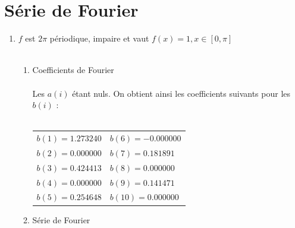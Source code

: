 \documentclass[a4paper,12pt]{report}
\begin{document}
\chapter{Série de Fourier}
	\begin{enumerate}
		\item $f$ est $2\pi$ périodique, impaire et vaut $f(x)=1, x \in [0,\pi]$ \\ \\
		\begin{enumerate}
			\item Coefficients de Fourier \\ \\
			Les $a(i)$ étant nuls. On obtient ainsi les coefficients suivants pour les $b(i)$ : \\ \\
			\begin{tabular}{l l}
				$b(1) = 1.273240$ & \hspace*{2cm}$b(6) = -0.000000$\\
				$b(2) = 0.000000$ & \hspace*{2cm}$b(7) = 0.181891$\\
				$b(3) = 0.424413$ & \hspace*{2cm}$b(8) = 0.000000$\\
				$b(4) = 0.000000$ & \hspace*{2cm}$b(9) = 0.141471$\\
				$b(5) = 0.254648$ & \hspace*{2cm}$b(10) = 0.000000$\\
			\end{tabular}
			\item Série de Fourier \\ \\ \\ \\ \\ \\ \\ \\ \\ \\ \\ \\ \\ \\


\end{enumerate}
\end{enumerate}
\end{document}
